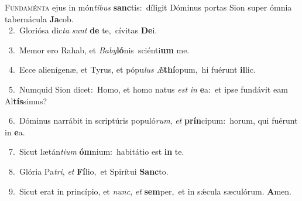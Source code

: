 \lettrine{\initial\textcolor{\initialcolor}{F}}{undaménta} ejus in món\-\textit{ti}\-\textit{bus} \textbf{sanc}\-tis:~\star díligit Dóminus portas Sion super ómnia tabernácula \textbf{Ja}\-cob.\\
{\numbfont\textcolor{\numbcolor}{~2.}}~Gloriósa dic\textit{ta} \textit{sunt} \textbf{de} te,~\star cívitas \textbf{De}\-i.\par
{\numbfont\textcolor{\numbcolor}{~3.}}~Memor ero Rahab, et \textit{Ba}\-\textit{by}\textbf{ló}nis~\star sciénti\textbf{um} me.\par
{\numbfont\textcolor{\numbcolor}{~4.}}~Ecce alienígenæ, et Tyrus, et pópu\textit{lus} \textit{Æ}\-\textbf{thí}opum,~\star hi fuérunt \textbf{il}\-lic.\par
{\numbfont\textcolor{\numbcolor}{~5.}}~Numquid Sion dicet:~\dagger Homo, et homo natus \textit{est} \textit{in} \textbf{e}\-a:~\star et ipse fundávit eam Al\-\textbf{tís}\-simus?\par
{\numbfont\textcolor{\numbcolor}{~6.}}~Dóminus narrábit in scriptúris populó\-\textit{rum}\-, \textit{et} \textbf{prín}\-cipum:~\star horum, qui fuérunt in \textbf{e}\-a.\par
{\numbfont\textcolor{\numbcolor}{~7.}}~Sicut lætán\-\textit{ti}\-\textit{um} \textbf{óm}\-nium:~\star habitátio est \textbf{in} te.\par
{\numbfont\textcolor{\numbcolor}{~8.}}~Glória Pa\-\textit{tri}\-, \textit{et} \textbf{Fí}\-lio,~\star et Spirítui \textbf{Sanc}\-to.\par
{\numbfont\textcolor{\numbcolor}{~9.}}~Sicut erat in princípio, et \textit{nunc}\-, \textit{et} \textbf{sem}\-per,~\star et in sǽcula sæculórum. \textbf{A}\-men.\par
